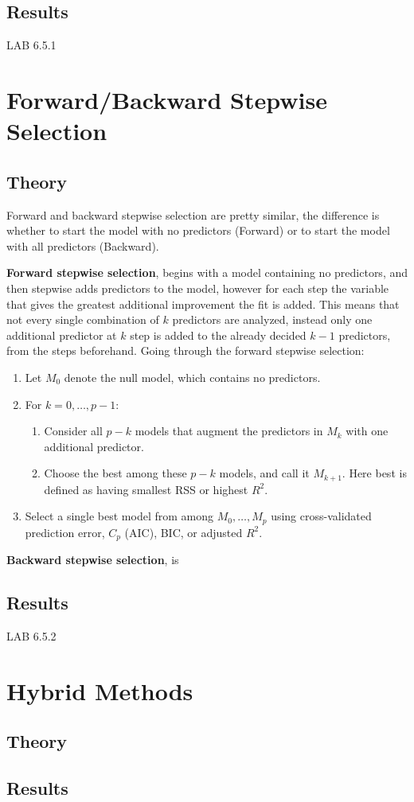 \subsection{Results}
LAB 6.5.1

\section{Forward/Backward Stepwise Selection}
\subsection{Theory}
Forward and backward stepwise selection are pretty similar, the difference is whether to start the model with no predictors (Forward) or to start the model with all predictors (Backward).

\textbf{Forward stepwise selection}, begins with a model containing no predictors, and then stepwise adds predictors to the model, however for each step the variable that gives the greatest additional improvement the fit is added. This means that not every single combination of $k$ predictors are analyzed, instead only one additional predictor at $k$ step is added to the already decided $k-1$ predictors, from the steps beforehand. Going through the forward stepwise selection:
\begin{enumerate}
	\item Let $M_0$ denote the null model, which contains no predictors.
	\item For $k=0,\dots,p-1$:
	\begin{enumerate}
		\item Consider all $p-k$ models that augment the predictors in $M_k$ with one additional predictor.
		\item Choose the best among these $p-k$ models, and call it $M_{k+1}$. Here best is defined as having smallest RSS or highest $R^2$.
	\end{enumerate}
	\item Select a single best model from among $M_0,\dots,M_p$ using cross-validated prediction error, $C_p$ (AIC), BIC, or adjusted $R^2$. 
\end{enumerate}

\textbf{Backward stepwise selection}, is 

\subsection{Results}
LAB 6.5.2

\section{Hybrid Methods}
\subsection{Theory}
\subsection{Results}